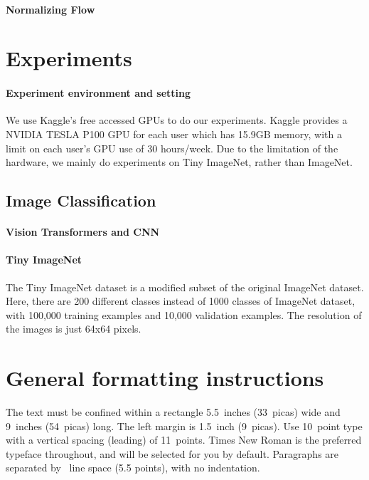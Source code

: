 \documentclass{article}
\begin{document}
\paragraph{Normalizing Flow}

\section{Experiments}
\paragraph{Experiment environment and setting}
We use Kaggle's free accessed GPUs to do our experiments. 
Kaggle provides a NVIDIA TESLA P100 GPU for each user which has 15.9GB memory, with a limit on each user's GPU use of 30 hours/week.
Due to the limitation of the hardware, we mainly do experiments on Tiny ImageNet, rather than ImageNet.

\subsection{Image Classification}

\paragraph{Vision Transformers and CNN}
\cite{dosovitskiy2020image}

\paragraph{Tiny ImageNet}
The Tiny ImageNet dataset is a modified subset of the original ImageNet dataset.
Here, there are 200 different classes instead of 1000 classes of ImageNet dataset,
with 100,000 training examples and 10,000 validation examples.
The resolution of the images is just 64x64 pixels.

\section{General formatting instructions}
\label{gen_inst}


The text must be confined within a rectangle 5.5~inches (33~picas) wide and
9~inches (54~picas) long. The left margin is 1.5~inch (9~picas).  Use 10~point
type with a vertical spacing (leading) of 11~points.  Times New Roman is the
preferred typeface throughout, and will be selected for you by default.
Paragraphs are separated by ~line space (5.5 points), with no
indentation.
\end{document}
